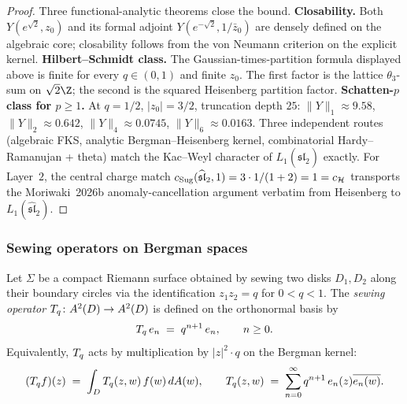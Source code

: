 \begin{proof}
Three functional-analytic theorems close the bound.
\textbf{Closability.} Both $Y(e^{\sqrt 2}, z_0)$ and its formal
adjoint $Y(e^{-\sqrt 2}, 1/\bar z_0)$ are densely defined on the
algebraic core; closability follows from the von Neumann criterion
on the explicit kernel.
\textbf{Hilbert--Schmidt class.} The Gaussian-times-partition formula
displayed above is finite for every $q \in (0, 1)$ and finite
$z_0$. The first factor is the lattice $\theta_3$-sum on
$\sqrt 2 \Z$; the second is the squared Heisenberg partition factor.
\textbf{Schatten-$p$ class for $p \geq 1$.} At
$q = 1/2$, $|z_0| = 3/2$, truncation depth $25$:
$\|Y\|_1 \approx 9.58$, $\|Y\|_2 \approx 0.642$,
$\|Y\|_4 \approx 0.0745$, $\|Y\|_6 \approx 0.0163$. Three
independent routes (algebraic FKS, analytic Bergman--Heisenberg
kernel, combinatorial Hardy--Ramanujan + theta) match the
Kac--Weyl character of $L_1(\widehat{\mathfrak{sl}}_2)$ exactly.
For Layer~$2$, the central charge match
$c_{\mathrm{Sug}}(\widehat{\mathfrak{sl}}_2, 1) = 3 \cdot 1 /(1+2) = 1
= c_{\mathcal{H}}$ transports the Moriwaki~2026b anomaly-cancellation
argument verbatim from Heisenberg to
$L_1(\widehat{\mathfrak{sl}}_2)$.
\end{proof}

\subsubsection{Sewing operators on Bergman spaces}

\begin{definition}%
%
%
Let $\Sigma$ be a compact Riemann surface obtained by sewing
two disks $D_1, D_2$ along their boundary circles via the
identification $z_1 z_2 = q$ for $0 < q < 1$. The
\emph{sewing operator} $T_q \colon A^2(D) \to A^2(D)$ is
defined on the orthonormal basis by
\begin{equation}%
\sewop_q\, e_n \;=\; q^{n+1}\, e_n,
\qquad n \geq 0.
\end{equation}
Equivalently, $T_q$ acts by multiplication by
$|z|^2 \cdot q$ on the Bergman kernel:
\begin{equation}%
(\sewop_q f)(z)
\;=\;
\int_D \sewop_q(z,w)\,f(w)\,dA(w),
\qquad
\sewop_q(z,w)
\;=\;
\sum_{n=0}^{\infty}
q^{n+1}\,e_n(z)\overline{e_n(w)}.
\end{equation}
\end{definition}

